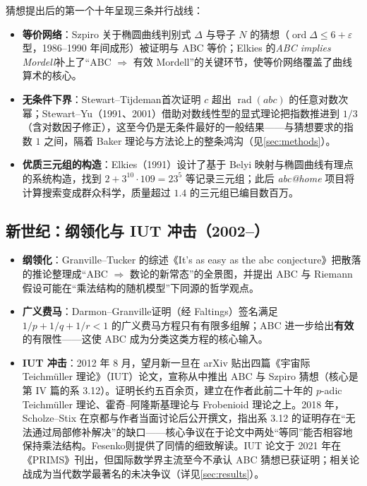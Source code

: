 猜想提出后的第一个十年呈现三条并行战线：

\begin{itemize}
    \item \textbf{等价网络}：Szpiro 关于椭圆曲线判别式 $\Delta$ 与导子 $N$ 的猜想（$\operatorname{ord} \Delta \leq 6 + \varepsilon$ 型，1986--1990 年间成形\cite{szpiro1990}）被证明与 ABC 等价；Elkies 的\textit{ABC implies Mordell}\cite{elkies1991}补上了“ABC $\Rightarrow$ 有效 Mordell”的关键环节，使等价网络覆盖了曲线算术的核心。
    \item \textbf{无条件下界}：Stewart--Tijdeman\cite{stewarttijdeman1986}首次证明 $c$ 超出 $\operatorname{rad}(abc)$ 的任意对数次幂；Stewart--Yu（1991、2001）\cite{stewartyu2001}借助对数线性型的显式理论把指数推进到 $1/3$（含对数因子修正），这至今仍是无条件最好的一般结果——与猜想要求的指数 $1$ 之间，隔着 Baker 理论与方法论上的整条鸿沟（见\cref{sec:methods}）。
    \item \textbf{优质三元组的构造}：Elkies（1991）设计了基于 Belyi 映射与椭圆曲线有理点的系统构造，找到 $2 + 3^{10}\cdot 109 = 23^5$ 等记录三元组；此后 \textit{abc@home} 项目将计算搜索变成群众科学，质量超过 $1.4$ 的三元组已编目数百万。
\end{itemize}

\subsection{新世纪：纲领化与 IUT 冲击（2002--）}

\begin{itemize}
    \item \textbf{纲领化}：Granville--Tucker 的综述《It's as easy as the abc conjecture》\cite{granvilletucker2002}把散落的推论整理成“ABC $\Rightarrow$ 数论的新常态”的全景图，并提出 ABC 与 Riemann 假设可能在“乘法结构的随机模型”下同源的哲学观点。
    \item \textbf{广义费马}：Darmon--Granville\cite{darmongranville1995}证明（经 Faltings）签名满足 $1/p + 1/q + 1/r < 1$ 的广义费马方程只有有限多组解；ABC 进一步给出\textbf{有效}的有限性——这使 ABC 成为分类这类方程的核心输入。
    \item \textbf{IUT 冲击}：2012 年 8 月，望月新一旦在 arXiv 贴出四篇《宇宙际 Teichm\"uller 理论》（IUT）论文\cite{mochizuki2012}，宣称从中推出 ABC 与 Szpiro 猜想（核心是第 IV 篇的系 3.12）。证明长约五百余页，建立在作者此前二十年的 $p$-adic Teichm\"uller 理论、霍奇--阿隆斯基理论与 Frobenioid 理论之上。2018 年，Scholze--Stix 在京都与作者当面讨论后公开撰文\cite{scholzestix2018}，指出系 3.12 的证明存在“无法通过局部修补解决”的缺口——核心争议在于论文中两处“等同”能否相容地保持乘法结构。Fesenko\cite{fesenko2015}则提供了同情的细致解读。IUT 论文于 2021 年在《PRIMS》刊出，但国际数学界主流至今不承认 ABC 猜想已获证明；相关论战成为当代数学最著名的未决争议（详见\cref{sec:results}）。
\end{itemize}
